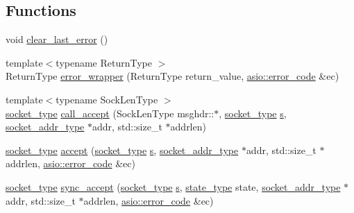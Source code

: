 \subsection*{Functions}
\begin{DoxyCompactItemize}
\item 
void \hyperlink{namespaceasio_1_1detail_1_1socket__ops_ab9ae8eefacd1c7fb7014e3e29db85412}{clear\+\_\+last\+\_\+error} ()
\item 
{\footnotesize template$<$typename Return\+Type $>$ }\\Return\+Type \hyperlink{namespaceasio_1_1detail_1_1socket__ops_a57ec49ce75c53385935f63875b3d4eaa}{error\+\_\+wrapper} (Return\+Type return\+\_\+value, \hyperlink{classasio_1_1error__code}{asio\+::error\+\_\+code} \&ec)
\item 
{\footnotesize template$<$typename Sock\+Len\+Type $>$ }\\\hyperlink{namespaceasio_1_1detail_a6798c771dd84b79798b1a08150706ea9}{socket\+\_\+type} \hyperlink{namespaceasio_1_1detail_1_1socket__ops_a92387ebc5f29671a79e3606f505ae8f7}{call\+\_\+accept} (Sock\+Len\+Type msghdr\+::$\ast$, \hyperlink{namespaceasio_1_1detail_a6798c771dd84b79798b1a08150706ea9}{socket\+\_\+type} \hyperlink{group__async__connect_ga31ab74b9ea6c77932dddd016cfc7920a}{s}, \hyperlink{namespaceasio_1_1detail_a40a7b0385a38f87815ffbb8df5e34d05}{socket\+\_\+addr\+\_\+type} $\ast$addr, std\+::size\+\_\+t $\ast$addrlen)
\item 
\hyperlink{namespaceasio_1_1detail_a6798c771dd84b79798b1a08150706ea9}{socket\+\_\+type} \hyperlink{namespaceasio_1_1detail_1_1socket__ops_aeb0907d9c536f6d228d789c6fb44c1b2}{accept} (\hyperlink{namespaceasio_1_1detail_a6798c771dd84b79798b1a08150706ea9}{socket\+\_\+type} \hyperlink{group__async__connect_ga31ab74b9ea6c77932dddd016cfc7920a}{s}, \hyperlink{namespaceasio_1_1detail_a40a7b0385a38f87815ffbb8df5e34d05}{socket\+\_\+addr\+\_\+type} $\ast$addr, std\+::size\+\_\+t $\ast$addrlen, \hyperlink{classasio_1_1error__code}{asio\+::error\+\_\+code} \&ec)
\item 
\hyperlink{namespaceasio_1_1detail_a6798c771dd84b79798b1a08150706ea9}{socket\+\_\+type} \hyperlink{namespaceasio_1_1detail_1_1socket__ops_ad31b02360f4c25736aea67c3e8f98663}{sync\+\_\+accept} (\hyperlink{namespaceasio_1_1detail_a6798c771dd84b79798b1a08150706ea9}{socket\+\_\+type} \hyperlink{group__async__connect_ga31ab74b9ea6c77932dddd016cfc7920a}{s}, \hyperlink{namespaceasio_1_1detail_1_1socket__ops_a5ce32ee297edef8833113ea35a933054}{state\+\_\+type} state, \hyperlink{namespaceasio_1_1detail_a40a7b0385a38f87815ffbb8df5e34d05}{socket\+\_\+addr\+\_\+type} $\ast$addr, std\+::size\+\_\+t $\ast$addrlen, \hyperlink{classasio_1_1error__code}{asio\+::error\+\_\+code} \&ec)

\end{DoxyCompactItemize}
